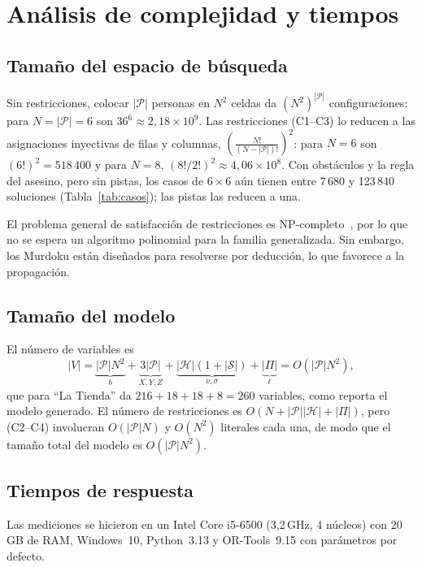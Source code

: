 \documentclass[conference,a4paper]{IEEEtran}
\begin{document}
\section{Análisis de complejidad y tiempos}

\subsection{Tamaño del espacio de búsqueda}
Sin restricciones, colocar $|\mathcal{P}|$ personas en $N^2$ celdas da
$(N^2)^{|\mathcal{P}|}$ configuraciones: para $N=|\mathcal{P}|=6$ son
$36^6\approx2{,}18\times10^9$. Las restricciones (C1--C3) lo reducen a las asignaciones
inyectivas de filas y columnas, $\left(\frac{N!}{(N-|\mathcal{P}|)!}\right)^2$: para $N=6$
son $(6!)^2=518\,400$ y para $N=8$, $(8!/2!)^2\approx4{,}06\times10^8$. Con obstáculos y la
regla del asesino, pero sin pistas, los casos de $6\times6$ aún tienen entre 7\,680 y
123\,840 soluciones (Tabla~\ref{tab:casos}); las pistas las reducen a una.

El problema general de satisfacción de restricciones es NP-completo~\cite{rossi2006handbook},
por lo que no se espera un algoritmo polinomial para la familia generalizada. Sin embargo,
los Murdoku están diseñados para resolverse por deducción, lo que favorece a la propagación.

\subsection{Tamaño del modelo}
El número de variables es
\begin{equation}
  |V| = \underbrace{|\mathcal{P}|N^2}_{b} + \underbrace{3|\mathcal{P}|}_{X,Y,Z}
        + \underbrace{|\mathcal{H}|(1+|\mathcal{S}|)}_{\nu,\sigma} + \underbrace{|\Pi|}_{\ell}
  = O(|\mathcal{P}|N^2),
\end{equation}
que para ``La Tienda'' da $216+18+18+8=260$ variables, como reporta el modelo generado. El
número de restricciones es $O(N+|\mathcal{P}||\mathcal{H}|+|\Pi|)$, pero (C2--C4)
involucran $O(|\mathcal{P}|N)$ y $O(N^2)$ literales cada una, de modo que el tamaño total
del modelo es $O(|\mathcal{P}|N^2)$.

\subsection{Tiempos de respuesta}
Las mediciones se hicieron en un Intel Core i5-6500 (3,2\,GHz, 4 núcleos) con 20\,GB de RAM,
Windows~10, Python~3.13 y OR-Tools~9.15 con parámetros por defecto.
\end{document}
